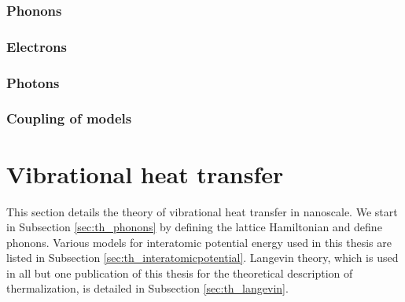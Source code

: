 \subsubsection{Phonons}

\subsubsection{Electrons}

\subsubsection{Photons}

\subsubsection{Coupling of models}





\iffalse

\section{Vibrational heat transfer}
\label{sec:th_vibtheory}

This section details the theory of vibrational heat transfer in nanoscale. We start in Subsection \ref{sec:th_phonons} by defining the lattice Hamiltonian and define phonons. Various models for interatomic potential energy used in this thesis are listed in Subsection \ref{sec:th_interatomicpotential}. Langevin theory, which is used in all but one publication of this thesis for the theoretical description of thermalization, is detailed in Subsection \ref{sec:th_langevin}.

